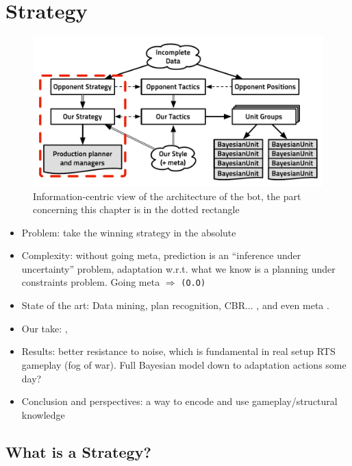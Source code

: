 \chapter{Strategy}
\begin{figure}[!ht]
\begin{center}
\includegraphics[width=13cm]{images/starcraft_bbq_concept_STRATEGY.pdf}
\end{center}
\label{fig:conceptSTRATEGY}
\caption{Information-centric view of the architecture of the bot, the part concerning this chapter is in the dotted rectangle}
\end{figure}
\begin{itemize}
\item Problem: take the winning strategy in the absolute
\item Complexity: without going meta, prediction is an ``inference under uncertainty'' problem, adaptation w.r.t. what we know is a planning under constraints problem. Going meta $\Rightarrow$ \texttt{(O.O)}
\item State of the art: Data mining, plan recognition, CBR... \citep{weberStrat}, \citep{Weber2010qf} and even meta \citep{metalevelbehavioradaptrts}.
\item Our take: \citep{SYNNAEVE:OpeningPred}, \citep{SYNNAEVE:StratPred}
\item Results: better resistance to noise, which is fundamental in real setup RTS gameplay (fog of war). Full Bayesian model down to adaptation actions some day?
\item Conclusion and perspectives: a way to encode and use gameplay/structural knowledge 
\end{itemize}

\section{What is a Strategy?}

